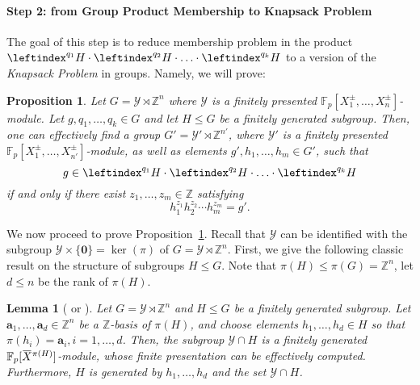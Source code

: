 \documentclass[a4paper,UKenglish,cleveref, autoref, thm-restate]{lipics-v2021}
\newcommand{\Z}{\mathbb{Z}}
\newcommand{\F}{\mathbb{F}}
\newcommand{\mY}{\mathcal{Y}}
\newcommand{\ba}{\boldsymbol{a}}
\newcommand{\bzer}{\boldsymbol{0}}
\newcommand{\oX}{\mkern 1.5mu\overline{\mkern-1.5mu X \mkern-1.5mu}\mkern 1.5mu}
\newtheorem{lem}[thrm]{Lemma}
\newtheorem{prop}[thrm]{Proposition}
\theoremstyle{definition}
\theoremstyle{definition}
\theoremstyle{definition}
\begin{document}
\paragraph*{Step 2: from Group Product Membership to Knapsack Problem}
The goal of this step is to reduce membership problem in the product $\leftindex^{q_1}{H} \cdot \leftindex^{q_2}{H} \cdot \ldots \cdot \leftindex^{q_{k}}{H}$ to a version of the \emph{Knapsack Problem} in groups.
Namely, we will prove:
\begin{prop}\label{prop:GPtoKP}
    Let $G = \mY \rtimes \Z^n$ where $\mY$ is a finitely presented $\F_p[X_1^{\pm}, \ldots, X_{n}^{\pm}]$-module.
    Let $g, q_1, \ldots, q_k \in G$ and let $H \leq G$ be a finitely generated subgroup.
    Then, one can effectively find a group $G' = \mY' \rtimes \Z^{n'}$, where $\mY'$ is a finitely presented $\F_p[X_1^{\pm}, \ldots, X_{n'}^{\pm}]$-module, as well as elements $g', h_1, \ldots, h_m \in G'$, such that
    \[
    g \in \leftindex^{q_1}{H} \cdot \leftindex^{q_2}{H} \cdot \ldots \cdot \leftindex^{q_{k}}{H}
    \]
    if and only if there exist $z_1, \ldots, z_m \in \Z$ satisfying
    \begin{equation}\label{eq:KP2}
        h_1^{z_1} h_2^{z_2} \cdots h_m^{z_m} = g'.
    \end{equation}
\end{prop}

We now proceed to prove Proposition~\ref{prop:GPtoKP}.
Recall that $\mY$ can be identified with the subgroup $\mY \times \{\bzer\} = \ker(\pi)$ of $G = \mY \rtimes \Z^n$. 
First, we give the following classic result on the structure of subgroups $H \leq G$.
Note that $\pi(H) \leq \pi(G) = \Z^n$, let $d \leq n$ be the rank of $\pi(H)$.

\begin{lem}[{\cite[Theorem~3.3]{baumslag1994algorithmic} or \cite[Lemma~2]{romanovskii1974some}}]\label{lem:structmeta}
    Let $G = \mY \rtimes \Z^n$ and $H \leq G$ be a finitely generated subgroup. Let $\ba_1, \ldots, \ba_{d} \in \Z^n$ be a $\Z$-basis of $\pi(H)$, and choose elements $h_1, \ldots, h_d \in H$ so that $\pi(h_i) = \ba_i, i = 1, \ldots, d$.
    Then, the subgroup $\mY \cap H$ is a finitely generated $\F_p[\oX^{\pi(H)}]$-module, whose finite presentation can be effectively computed. Furthermore, $H$ is generated by $h_1, \ldots, h_d$ and the set $\mY \cap H$.
\end{lem}
\end{document}

